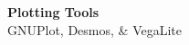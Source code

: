 \documentclass[10pt,landscape]{article}
\newcommand{\header}{
\begin{mdframed}[]
\footnotesize
\sffamily
\LARGE{\textbf{Plotting Tools}} \\ \small{GNUPlot, Desmos, \& VegaLite}
\end{mdframed}
}
\begin{document}
\small
\begin{multicols*}{4}
\header





\vfill\,


\end{multicols*}
\end{document}
